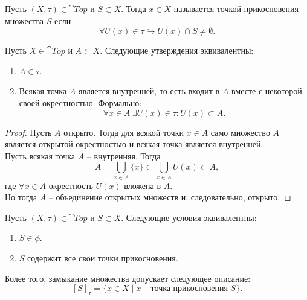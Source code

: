 \begin{definition}
    Пусть $(X, \tau) \in \cat{Top}$ и $S \subset X$.
    Тогда $x \in X$ называется точкой прикосновения множества $S$ если
    \[
        \forall U(x) \in \tau \hookrightarrow U(x) \cap S \neq \emptyset.
    \]
\end{definition}
\begin{lemma}
    Пусть $X \in \cat{Top}$ и $A \subset X$.
    Следующие утверждения эквивалентны:
    \begin{enumerate}
        \item $A \in \tau$.
        \item Всякая точка $A$ является внутренней, то есть входит в $A$ вместе с некоторой своей окрестностью.
        Формально:
        \[
            \forall x \in A \ \exists U(x) \in \tau \colon U(x) \subset A.
        \]
    \end{enumerate}
\end{lemma}
\begin{proof}
    Пусть $A$ открыто.
    Тогда для всякой точки $x \in A$ само множество $A$ является открытой окрестностью и всякая точка является внутренней. \\
    Пусть всякая точка $A$ -- внутренняя.
    Тогда
    \[
        A = \bigcup_{x \in A} \{x\} \subset \bigcup_{x \in A} U(x) \subset A,
    \]
    где $\forall x \in A$ окрестность $U(x)$ вложена в $A$. \\
    Но тогда $A$ -- объединение открытых множеств и, следовательно, открыто.
\end{proof}
\begin{proposition}
    Пусть $(X, \tau) \in \cat{Top}$ и $S \subset X$.
    Следующие условия эквивалентны:
    \begin{enumerate}
        \item $S \in \phi$.
        \item $S$ содержит все свои точки прикосновения.
    \end{enumerate}
    Более того, замыкание множества допускает следующее описание:
    \[
        [S]_\tau = \{x \in X \mid x \text{ -- точка прикосновения }S\}.
    \]
\end{proposition}
